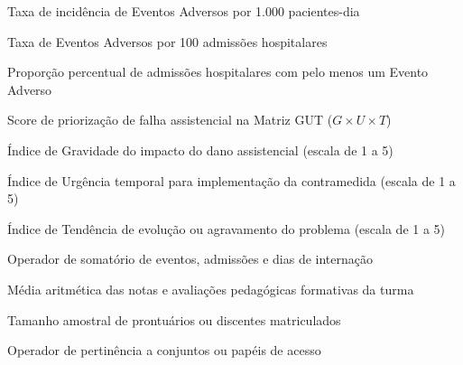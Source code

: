 \begin{simbolos}
  \item[$ TI_{1000} $] Taxa de incidência de Eventos Adversos por 1.000 pacientes-dia
  \item[$ TI_{100} $] Taxa de Eventos Adversos por 100 admissões hospitalares
  \item[$ P_{EA} $] Proporção percentual de admissões hospitalares com pelo menos um Evento Adverso
  \item[$ S_{GUT} $] Score de priorização de falha assistencial na Matriz GUT ($G \times U \times T$)
  \item[$ G $] Índice de Gravidade do impacto do dano assistencial (escala de 1 a 5)
  \item[$ U $] Índice de Urgência temporal para implementação da contramedida (escala de 1 a 5)
  \item[$ T $] Índice de Tendência de evolução ou agravamento do problema (escala de 1 a 5)
  \item[$ \sum $] Operador de somatório de eventos, admissões e dias de internação
  \item[$ \bar{X} $] Média aritmética das notas e avaliações pedagógicas formativas da turma
  \item[$ N $] Tamanho amostral de prontuários ou discentes matriculados
  \item[$ \in $] Operador de pertinência a conjuntos ou papéis de acesso
\end{simbolos}